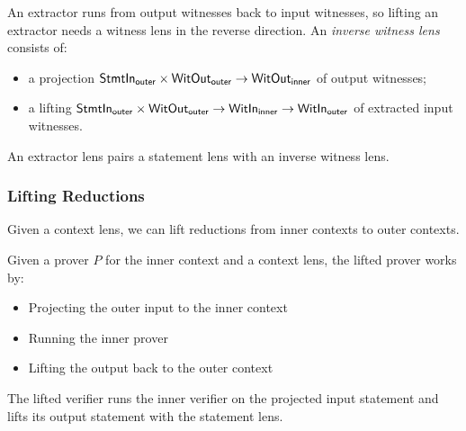 \begin{definition}
    \label{def:extractor_lens}
    An extractor runs from output witnesses back to input witnesses, so lifting an extractor needs a
    witness lens in the reverse direction. An \emph{inverse witness lens} consists of:
    \begin{itemize}
        \item a projection $\mathsf{StmtIn}_{\mathsf{outer}} \times \mathsf{WitOut}_{\mathsf{outer}} \to \mathsf{WitOut}_{\mathsf{inner}}$ of output witnesses;
        \item a lifting $\mathsf{StmtIn}_{\mathsf{outer}} \times \mathsf{WitOut}_{\mathsf{outer}} \to \mathsf{WitIn}_{\mathsf{inner}} \to \mathsf{WitIn}_{\mathsf{outer}}$ of extracted input witnesses.
    \end{itemize}
    An extractor lens pairs a statement lens with an inverse witness lens.
    \leanok
\end{definition}

\subsubsection{Lifting Reductions}

Given a context lens, we can lift reductions from inner contexts to outer contexts.

\begin{definition}
    \label{def:prover_lift_context}
    Given a prover $P$ for the inner context and a context lens, the lifted prover works by:
    \begin{itemize}
        \item Projecting the outer input to the inner context
        \item Running the inner prover
        \item Lifting the output back to the outer context
    \end{itemize}
    \leanok
\end{definition}

\begin{definition}
    \label{def:verifier_lift_context}
    The lifted verifier runs the inner verifier on the projected input statement and lifts its
    output statement with the statement lens.
    \leanok
\end{definition}

